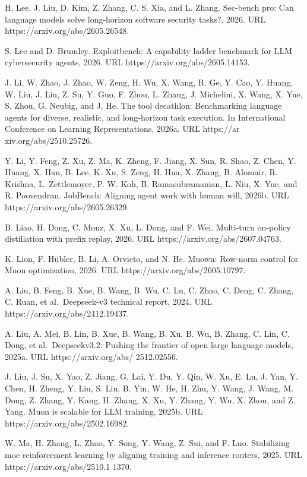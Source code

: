 H. Lee, J. Liu, D. Kim, Z. Zhang, C. S. Xia, and L. Zhang. Sec-bench
pro: Can language models solve long-horizon software security tasks?,
2026. URL https://arxiv.org/abs/2605.26548.

S. Lee and D. Brumley. Exploitbench: A capability ladder benchmark for
LLM cybersecurity agents, 2026. URL https://arxiv.org/abs/2605.14153.

J. Li, W. Zhao, J. Zhao, W. Zeng, H. Wu, X. Wang, R. Ge, Y. Cao, Y.
Huang, W. Liu, J. Liu, Z. Su, Y. Guo, F. Zhou, L. Zhang, J. Michelini,
X. Wang, X. Yue, S. Zhou, G. Neubig, and J. He. The tool decathlon:
Benchmarking language agents for diverse, realistic, and long-horizon
task execution. In International Conference on Learning Representations,
2026a. URL https://ar xiv.org/abs/2510.25726.

Y. Li, Y. Feng, Z. Xu, Z. Ma, K. Zheng, F. Jiang, X. Sun, R. Shao, Z.
Chen, Y. Huang, X. Han, B. Lee, K. Xu, S. Zeng, H. Hua, X. Zhang, B.
Alomair, R. Krishna, L. Zettlemoyer, P. W. Koh, B. Ramasubramanian, L.
Niu, X. Yue, and R. Poovendran. JobBench: Aligning agent work with human
will, 2026b. URL https://arxiv.org/abs/2605.26329.

B. Liao, H. Dong, C. Monz, X. Xu, L. Dong, and F. Wei. Multi-turn
on-policy distillation with prefix replay, 2026. URL
https://arxiv.org/abs/2607.04763.

K. Lion, F. Hübler, B. Li, A. Orvieto, and N. He. Muown: Row-norm
control for Muon optimization, 2026. URL
https://arxiv.org/abs/2605.10797.



A. Liu, B. Feng, B. Xue, B. Wang, B. Wu, C. Lu, C. Zhao, C. Deng, C.
Zhang, C. Ruan, et al.~Deepseek-v3 technical report, 2024. URL
https://arxiv.org/abs/2412.19437.

A. Liu, A. Mei, B. Lin, B. Xue, B. Wang, B. Xu, B. Wu, B. Zhang, C. Lin,
C. Dong, et al.~Deepseekv3.2: Pushing the frontier of open large
language models, 2025a. URL https://arxiv.org/abs/ 2512.02556.

J. Liu, J. Su, X. Yao, Z. Jiang, G. Lai, Y. Du, Y. Qin, W. Xu, E. Lu, J.
Yan, Y. Chen, H. Zheng, Y. Liu, S. Liu, B. Yin, W. He, H. Zhu, Y. Wang,
J. Wang, M. Dong, Z. Zhang, Y. Kang, H. Zhang, X. Xu, Y. Zhang, Y. Wu,
X. Zhou, and Z. Yang. Muon is scalable for LLM training, 2025b. URL
https://arxiv.org/abs/2502.16982.

W. Ma, H. Zhang, L. Zhao, Y. Song, Y. Wang, Z. Sui, and F. Luo.
Stabilizing moe reinforcement learning by aligning training and
inference routers, 2025. URL https://arxiv.org/abs/2510.1 1370.

